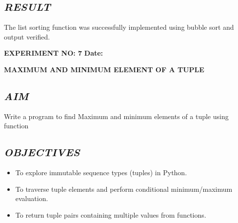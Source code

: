 \documentclass[11pt,a4paper]{article}
\begin{document}
\subsection*{\textit{RESULT}}
The list sorting function was successfully implemented using bubble sort and output verified.

\newpage

\noindent
\textbf{\large EXPERIMENT NO: 7} \hfill \textbf{\large Date: \underline{\hspace{3cm}}}

\vspace{0.2cm}
\begin{center}
{\Huge \textbf{\textcolor{navyblue}{MAXIMUM AND MINIMUM ELEMENT OF A TUPLE}}}
\end{center}
\vspace{0.3cm}

\subsection*{\textit{AIM}}
Write a program to find Maximum and minimum elements of a tuple using function

\subsection*{\textit{OBJECTIVES}}
\begin{itemize}
  \item To explore immutable sequence types (tuples) in Python.
  \item To traverse tuple elements and perform conditional minimum/maximum evaluation.
  \item To return tuple pairs containing multiple values from functions.
\end{itemize}
\end{document}
